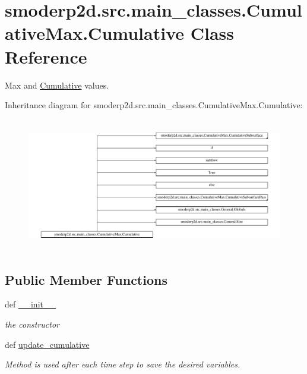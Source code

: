 \hypertarget{classsmoderp2d_1_1src_1_1main__classes_1_1CumulativeMax_1_1Cumulative}{\section{smoderp2d.\-src.\-main\-\_\-classes.\-Cumulative\-Max.\-Cumulative Class Reference}
\label{classsmoderp2d_1_1src_1_1main__classes_1_1CumulativeMax_1_1Cumulative}
}


Max and \hyperlink{classsmoderp2d_1_1src_1_1main__classes_1_1CumulativeMax_1_1Cumulative}{Cumulative} values.  


Inheritance diagram for smoderp2d.\-src.\-main\-\_\-classes.\-Cumulative\-Max.\-Cumulative\-:\begin{figure}[H]
\begin{center}
\leavevmode
\includegraphics[height=5.846868cm]{classsmoderp2d_1_1src_1_1main__classes_1_1CumulativeMax_1_1Cumulative}
\end{center}
\end{figure}
\subsection*{Public Member Functions}
\begin{DoxyCompactItemize}
\item 
def \hyperlink{classsmoderp2d_1_1src_1_1main__classes_1_1CumulativeMax_1_1Cumulative_aa0e7706be42a1c06b1861c1e8c100c4c}{\-\_\-\-\_\-init\-\_\-\-\_\-}
\begin{DoxyCompactList}\small\item\em the constructor \end{DoxyCompactList}\item 
def \hyperlink{classsmoderp2d_1_1src_1_1main__classes_1_1CumulativeMax_1_1Cumulative_a8ff1f325481804578ec1cdc47616a808}{update\-\_\-cumulative}
\begin{DoxyCompactList}\small\item\em Method is used after each time step to save the desired variables. \end{DoxyCompactList}\end{DoxyCompactItemize}
